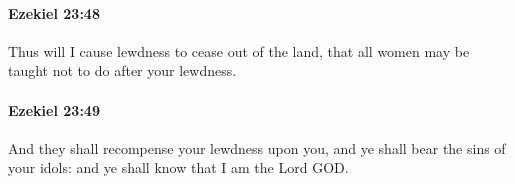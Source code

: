 		\paragraph{Ezekiel 23:48} %
			\label{EZEKIEL-23-48}

			Thus will I cause lewdness to cease out of the land, that all women may be taught not to do after your lewdness.


		\paragraph{Ezekiel 23:49} %
			\label{EZEKIEL-23-49}

			And they shall recompense your lewdness upon you, and ye shall bear the sins of your idols: and ye shall know that I am the Lord GOD.

